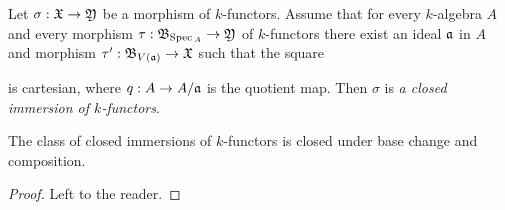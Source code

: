 \begin{definition}
Let $\sigma:{\mathfrak X}\rightarrow {\mathfrak Y}$ be a morphism of $k$-functors. Assume that for every $k$-algebra $A$ and every morphism $\tau:{\mathfrak B}_{\mathrm{Spec}\,_A}\rightarrow {\mathfrak Y}$ of $k$-functors there exist an ideal $\mathfrak{a}$ in $A$ and morphism $\tau':{\mathfrak B}_{V(\mathfrak{a})}\rightarrow {\mathfrak X}$ such that the square
\begin{center}
\end{center}
is cartesian, where $q:A\rightarrow A/\mathfrak{a}$ is the quotient map. Then $\sigma$ is \textit{a closed immersion of $k$-functors}.
\end{definition}

\begin{fact}\label{fact:closedimmersionsclosedunderbasechangeandcomposition}
The class of closed immersions of $k$-functors is closed under base change and composition.
\end{fact}
\begin{proof}
Left to the reader.
\end{proof}

